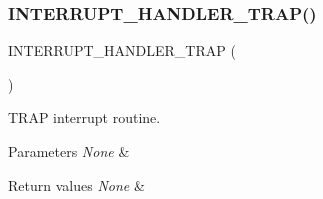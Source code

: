 \subsubsection{\texorpdfstring{I\+N\+T\+E\+R\+R\+U\+P\+T\+\_\+\+H\+A\+N\+D\+L\+E\+R\+\_\+\+T\+R\+A\+P()}{INTERRUPT\_HANDLER\_TRAP()}}
{\footnotesize\ttfamily I\+N\+T\+E\+R\+R\+U\+P\+T\+\_\+\+H\+A\+N\+D\+L\+E\+R\+\_\+\+T\+R\+AP (\begin{DoxyParamCaption}\item[{T\+R\+A\+P\+\_\+\+I\+R\+Q\+Handler}]{ }\end{DoxyParamCaption})}



T\+R\+AP interrupt routine. 


\begin{DoxyParams}{Parameters}
{\em None} & \\
\hline
\end{DoxyParams}

\begin{DoxyRetVals}{Return values}
{\em None} & \\
\hline
\end{DoxyRetVals}
